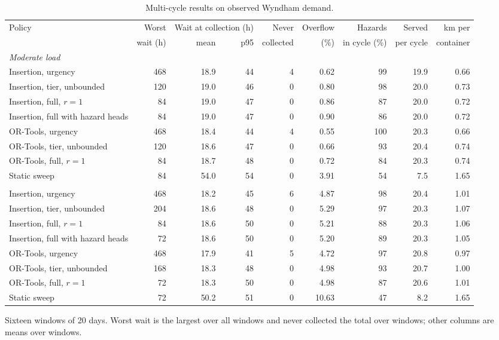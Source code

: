 \begin{table}[!htbp]
\caption{Multi-cycle results on observed Wyndham demand.}
\label{tab:replay}
\centering
\footnotesize
\setlength{\tabcolsep}{3pt}
\begin{tabular}{lrrrrrrrr}
\toprule
Policy & Worst & \multicolumn{2}{c}{Wait at collection (h)} & Never & Overflow & Hazards & Served & km per \\
\cmidrule(lr){3-4}
 & wait (h) & mean & p95 & collected & (\%) & in cycle (\%) & per cycle & container \\
\midrule
\multicolumn{9}{l}{\emph{Moderate load}} \\
Insertion, urgency & 468 & 18.9 & 44 & 4 & 0.62 & 99 & 19.9 & 0.66 \\
Insertion, tier, unbounded & 120 & 19.0 & 46 & 0 & 0.80 & 98 & 20.0 & 0.73 \\
Insertion, full, $r = 1$ & 84 & 19.0 & 47 & 0 & 0.86 & 87 & 20.0 & 0.72 \\
Insertion, full with hazard heads & 84 & 19.0 & 47 & 0 & 0.90 & 86 & 20.0 & 0.72 \\
OR-Tools, urgency & 468 & 18.4 & 44 & 4 & 0.55 & 100 & 20.3 & 0.66 \\
OR-Tools, tier, unbounded & 120 & 18.6 & 47 & 0 & 0.66 & 93 & 20.4 & 0.74 \\
OR-Tools, full, $r = 1$ & 84 & 18.7 & 48 & 0 & 0.72 & 84 & 20.3 & 0.74 \\
Static sweep & 84 & 54.0 & 54 & 0 & 3.91 & 54 & 7.5 & 1.65 \\
\addlinespace
\multicolumn{9}{l}{\emph{Tight load}} \\
Insertion, urgency & 468 & 18.2 & 45 & 6 & 4.87 & 98 & 20.4 & 1.01 \\
Insertion, tier, unbounded & 204 & 18.6 & 48 & 0 & 5.29 & 97 & 20.3 & 1.07 \\
Insertion, full, $r = 1$ & 84 & 18.6 & 50 & 0 & 5.21 & 88 & 20.3 & 1.06 \\
Insertion, full with hazard heads & 72 & 18.6 & 50 & 0 & 5.20 & 89 & 20.3 & 1.05 \\
OR-Tools, urgency & 468 & 17.9 & 41 & 5 & 4.72 & 97 & 20.8 & 0.97 \\
OR-Tools, tier, unbounded & 168 & 18.3 & 48 & 0 & 4.98 & 93 & 20.7 & 1.00 \\
OR-Tools, full, $r = 1$ & 72 & 18.3 & 50 & 0 & 4.98 & 87 & 20.6 & 1.01 \\
Static sweep & 72 & 50.2 & 51 & 0 & 10.63 & 47 & 8.2 & 1.65 \\
\bottomrule
\end{tabular}
\par\smallskip\footnotesize Sixteen windows of 20 days. Worst wait is the largest over all windows and never collected the total over windows; other columns are means over windows.
\end{table}
